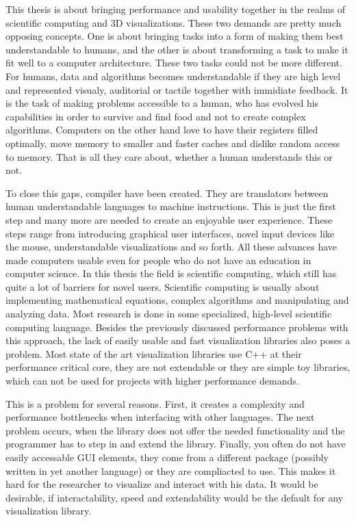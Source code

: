 
This thesis is about bringing performance and usability together in the realms of scientific computing and 3D visualizations.
These two demands are pretty much opposing concepts. One is about bringing tasks into a form of making them best understandable to humans, and the other is about transforming a task to make it fit well to a computer architecture.
These two tasks could not be more different. For humans, data and algorithms becomes understandable if they are high level and represented visualy, auditorial or tactile together with immidiate feedback. 
It is the task of making problems accessible to a human, who has evolved his capabilities in order to survive and find food and not to create complex algorithms.
Computers on the other hand love to have their registers filled optimally, move memory to smaller and faster caches and dislike random access to memory. That is all they care about, whether a human understands this or not.

To close this gaps, compiler have been created. They are translators between human understandable languages to machine instructions.
This is just the first step and many more are needed to create an enjoyable user experience.
These steps range from introducing graphical user interfaces, novel input devices like the mouse, understandable visualizations and so forth.
All these advances have made computers usable even for people who do not have an education in computer science.
In this thesis the field is scientific computing, which still has quite a lot of barriers for novel users.
Scientific computing is usually about implementing mathematical equations, complex algorithms and manipulating and analyzing data.
Most research is done in some specialized, high-level scientific computing language.
Besides the previously discussed performance problems with this approach, the lack of easily usable and fast visualization libraries also poses a problem.
Most state of the art visualization libraries use C++ at their performance critical core, they are not extendable or they are simple toy libraries, which can not be used for projects with higher performance demands.

This is a problem for several reasons.
First, it creates a complexity and performance bottlenecks when interfacing with other languages. The next problem occurs, when the library does not offer the needed functionality and the programmer has to step in and extend the library.
Finally, you often do not have easily accessable GUI elements, they come from a different package (possibly written in yet another language) or they are compliacted to use. 
This makes it hard for the researcher to visualize and interact with his data. It would be desirable, if interactability, speed and extendability would be the default for any visualization library.

